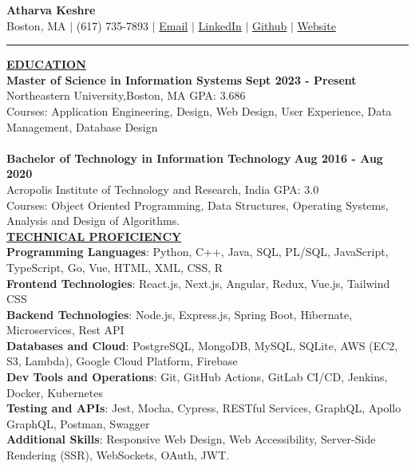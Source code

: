 \documentclass{article}
\begin{document}
\begin{center}
\thispagestyle{empty}
\large \textbf{\textbf{Atharva Keshre}  \\}
\normalsize  Boston, MA  $\mid$ (617) 735-7893 $\mid$ \href{mailto:keshre.a@northeastern.edu}{Email} $\mid$ \href{https://www.linkedin.com/in/atharva-keshre}{LinkedIn} $\mid$  \href{https://github.com/AtharvaKeshre}{Github} $\mid$  \href{https://atharvakeshre08.wixsite.com/website}{Website}  \\
\rule{\textwidth}{1pt}
\end{center}

\noindent \textbf{\underline{EDUCATION}} \\
\textbf{Master of Science in Information Systems} \hfill \textbf{Sept 2023 - Present } \\
Northeastern University,Boston, MA {GPA: 3.686}\\
Courses: Application Engineering, Design, Web Design, User Experience, Data Management, Database Design\\\\
\textbf{Bachelor of Technology in Information Technology} \hfill \textbf{Aug 2016 - Aug 2020 } \\
Acropolis Institute of Technology and Research, India {GPA: 3.0} \\
Courses: Object Oriented Programming, Data Structures, Operating Systems, Analysis and Design of Algorithms.\\


\noindent \textbf{\underline{TECHNICAL PROFICIENCY}} \\
\textbf{Programming Languages}: Python, C++, Java, SQL, PL/SQL, JavaScript, TypeScript, Go, Vue, HTML, XML, CSS, R \\
\textbf{Frontend Technologies}: React.js, Next.js, Angular, Redux, Vue.js, Tailwind CSS \\
\textbf{Backend Technologies}: Node.js, Express.js, Spring Boot, Hibernate, Microservices, Rest API \\
\textbf{Databases and Cloud}: PostgreSQL, MongoDB, MySQL, SQLite, AWS (EC2, S3, Lambda), Google Cloud Platform, Firebase \\
\textbf{Dev Tools and Operations}: Git, GitHub Actions, GitLab CI/CD, Jenkins, Docker, Kubernetes \\
\textbf{Testing and APIs}: Jest, Mocha, Cypress, RESTful Services, GraphQL, Apollo GraphQL, Postman, Swagger \\
\textbf{Additional Skills}: Responsive Web Design, Web Accessibility, Server-Side Rendering (SSR), WebSockets, OAuth, JWT.\\
\end{document}
